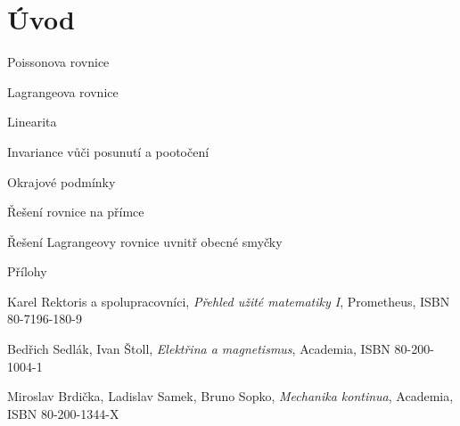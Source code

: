 \documentclass{book}
\begin{document}
\chapter{Úvod}
















\appendix




Poissonova rovnice

Lagrangeova rovnice

Linearita

Invariance vůči posunutí a pootočení

Okrajové podmínky

Řešení rovnice na přímce

Řešení Lagrangeovy rovnice uvnitř obecné smyčky

Přílohy

\begin{thebibliography}{9}

Karel Rektoris a spolupracovníci,
\textit{Přehled užité matematiky I},
Prometheus,
ISBN 80-7196-180-9

Bedřich Sedlák, Ivan Štoll,
\textit{Elektřina a magnetismus},
Academia,
ISBN 80-200-1004-1

Miroslav Brdička, Ladislav Samek, Bruno Sopko,
\textit{Mechanika kontinua},
Academia,
ISBN 80-200-1344-X


\end{thebibliography}
\end{document}
